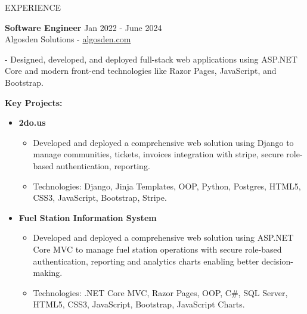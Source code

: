 \documentclass{resume} %
\begin{document}
\begin{rSection}{EXPERIENCE}
	
	\textbf{Software Engineer} \hfill Jan 2022 - June 2024\\
	Algosden Solutions -  \href{https://www.algosden.com/}{algosden.com}
		\itemsep 1pt {} 
		\item - Designed, developed, and deployed full-stack web applications using ASP.NET Core and modern front-end technologies like Razor Pages, JavaScript, and Bootstrap. 
		
		\item 
		\textbf{Key Projects:}
			\begin{itemize}
			\itemsep -3pt {} 
			\item \textbf{2do.us}
			
			\begin{itemize}
				\itemsep -3pt {} 
				\item Developed and deployed a comprehensive web solution using Django to manage communities, tickets, invoices integration with stripe, secure role-based authentication, reporting.
				
				\item Technologies: Django, Jinja Templates, OOP, Python, Postgres, HTML5, CSS3, JavaScript, Bootstrap, Stripe.
			\end{itemize}
		\end{itemize}
		\begin{itemize}
			\itemsep -3pt {} 
			\item \textbf{Fuel Station Information System}
			
			\begin{itemize}
				\itemsep -3pt {} 
				\item Developed and deployed a comprehensive web solution using ASP.NET Core MVC to manage fuel station operations with secure role-based authentication, reporting and analytics charts enabling better decision-making.

				\item Technologies: .NET Core MVC, Razor Pages, OOP, C\#, SQL Server, HTML5, CSS3, JavaScript, Bootstrap, JavaScript Charts.
			\end{itemize}
		\end{itemize}
	
		 
	

\end{rSection}
\end{document}
